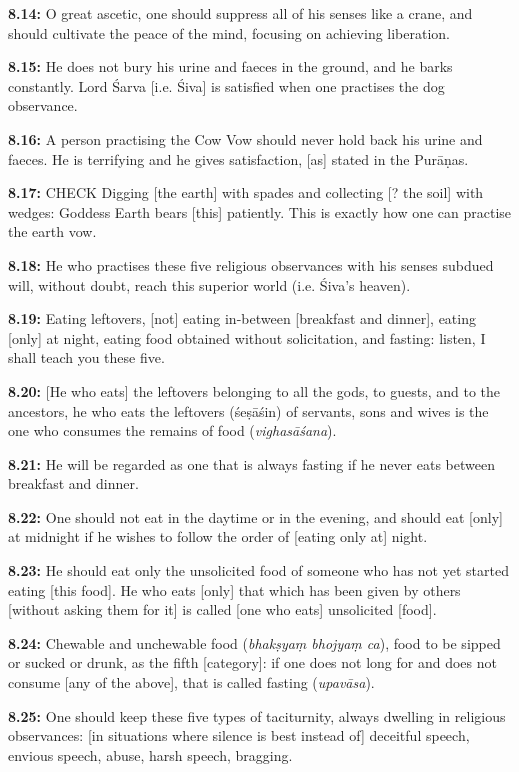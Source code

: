 \documentclass{article}
\newcommand{\vsnum}[1]{\textbf{#1}}
\newcommand{\skt}[1]{\textit{#1}}
\begin{document}
\vsnum{8.14: }O great ascetic, one should suppress all of his senses like a crane, and should cultivate the peace of the mind, focusing on achieving liberation.

\vsnum{8.15: }He does not bury his urine and faeces in the ground, and he barks constantly. Lord Śarva [i.e. Śiva] is satisfied when one practises the dog observance.

\vsnum{8.16: }A person practising the Cow Vow should never hold back his urine and faeces. He is terrifying and he gives satisfaction, [as] stated in the Purāṇas.

\vsnum{8.17: }CHECK Digging [the earth] with spades and collecting [? the soil] with wedges: Goddess Earth bears [this] patiently. This is exactly how one can practise the earth vow.

\vsnum{8.18: }He who practises these five religious observances with his senses subdued will, without doubt, reach this superior world (i.e. Śiva's heaven).

\vsnum{8.19: }Eating leftovers, [not] eating in-between [breakfast and dinner], eating [only] at night, eating food obtained without solicitation, and fasting: listen, I shall teach you these five.

\vsnum{8.20: }[He who eats] the leftovers belonging to all the gods, to guests, and to the ancestors, he who eats the leftovers (śeṣāśin) of servants, sons and wives is the one who consumes the remains of food (\skt{vighasāśana}).

\vsnum{8.21: }He will be regarded as one that is always fasting if he never eats between breakfast and dinner.

\vsnum{8.22: }One should not eat in the daytime or in the evening, and should eat [only] at midnight if he wishes to follow the order of [eating only at] night.

\vsnum{8.23: }He should eat only the unsolicited food of someone who has not yet started eating [this food]. He who eats [only] that which has been given by others [without asking them for it] is called [one who eats] unsolicited [food].

\vsnum{8.24: }Chewable and unchewable food (\skt{bhakṣyaṃ bhojyaṃ ca}), food to be sipped or sucked or drunk, as the fifth [category]: if one does not long for and does not consume [any of the above], that is called fasting (\skt{upavāsa}).

\vsnum{8.25: }One should keep these five types of taciturnity, always dwelling in religious observances: [in situations where silence is best instead of] deceitful speech, envious speech, abuse, harsh speech, bragging.
\end{document}
